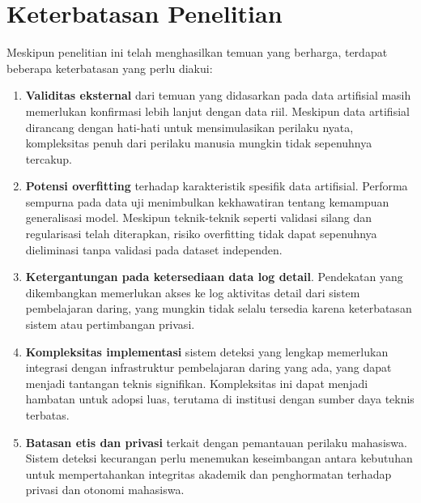 \section{Keterbatasan Penelitian}
\label{sec:keterbatasan}

Meskipun penelitian ini telah menghasilkan temuan yang berharga, terdapat beberapa keterbatasan yang perlu diakui:

\begin{enumerate}
    \item \textbf{Validitas eksternal} dari temuan yang didasarkan pada data artifisial masih memerlukan konfirmasi lebih lanjut dengan data riil. Meskipun data artifisial dirancang dengan hati-hati untuk mensimulasikan perilaku nyata, kompleksitas penuh dari perilaku manusia mungkin tidak sepenuhnya tercakup.
    
    \item \textbf{Potensi overfitting} terhadap karakteristik spesifik data artifisial. Performa sempurna pada data uji menimbulkan kekhawatiran tentang kemampuan generalisasi model. Meskipun teknik-teknik seperti validasi silang dan regularisasi telah diterapkan, risiko overfitting tidak dapat sepenuhnya dieliminasi tanpa validasi pada dataset independen.
    
    \item \textbf{Ketergantungan pada ketersediaan data log detail}. Pendekatan yang dikembangkan memerlukan akses ke log aktivitas detail dari sistem pembelajaran daring, yang mungkin tidak selalu tersedia karena keterbatasan sistem atau pertimbangan privasi.
    
    \item \textbf{Kompleksitas implementasi} sistem deteksi yang lengkap memerlukan integrasi dengan infrastruktur pembelajaran daring yang ada, yang dapat menjadi tantangan teknis signifikan. Kompleksitas ini dapat menjadi hambatan untuk adopsi luas, terutama di institusi dengan sumber daya teknis terbatas.
    
    \item \textbf{Batasan etis dan privasi} terkait dengan pemantauan perilaku mahasiswa. Sistem deteksi kecurangan perlu menemukan keseimbangan antara kebutuhan untuk mempertahankan integritas akademik dan penghormatan terhadap privasi dan otonomi mahasiswa.
\end{enumerate}

